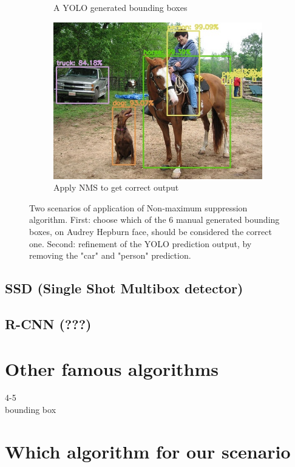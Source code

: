 \begin{figure}[!h]
\begin{subfigure}{.35\linewidth}
		\caption{A YOLO generated bounding boxes}
		\label{fig:sub_noNMS_yolo}
	\end{subfigure}
	\begin{subfigure}{.35\linewidth}
		\includegraphics[width=0.9\linewidth]{images/ex2_yolo}
		\caption{Apply NMS to get correct output}
		\label{fig:sub_withNMS_yolo}
	\end{subfigure}
	\caption{Two scenarios of application of Non-maximum suppression algorithm. First: choose which of the 6 manual generated bounding boxes, on Audrey Hepburn face, should be considered the correct one. Second: refinement of the YOLO prediction output, by removing the "car" and "person" prediction.}
	\label{fig:nms}
\end{figure}

\subsection{SSD (Single Shot Multibox detector)} \label{sec:ssd} 
\cite{ssd}
\subsection{R-CNN (???)} \label{sec:r-cnn}

\section{Other famous algorithms}
4-5\\
bounding box

\section{Which algorithm for our scenario}